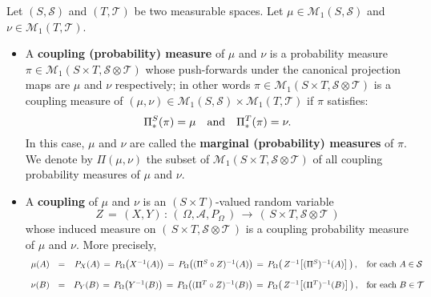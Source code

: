 \begin{definition}
\mbox{}\vskip 0.1cm
\noindent
Let $\left(S,\mathcal{S}\right)$ and $\left(T,\mathcal{T}\right)$ be two measurable spaces.
Let $\mu \in \mathcal{M}_{1}\!\left(S,\mathcal{S}\right)$ and
$\nu \in \mathcal{M}_{1}\!\left(T,\mathcal{T}\right)$.
\begin{itemize}
\item
	A \textbf{coupling (probability) measure} of $\mu$ and $\nu$ is a probability measure
	$\pi \in \mathcal{M}_{1}\!\left(S \times T, \mathcal{S} \otimes \mathcal{T}\right)$
	whose push-forwards under the canonical projection maps are $\mu$ and $\nu$ respectively;
	in other words
	$\pi \in \mathcal{M}_{1}\!\left(S \times T, \mathcal{S} \otimes \mathcal{T}\right)$
	is a coupling measure of
	$(\mu,\nu ) \in \mathcal{M}_{1}\!\left(S,\mathcal{S}\right) \times \mathcal{M}_{1}\!\left(T,\mathcal{T}\right)$
	if $\pi$ satisfies:
	\begin{equation*}
		\Pi^{S}_{*}(\pi) = \mu
		\quad\textnormal{and}\quad
		\Pi^{T}_{*}(\pi) = \nu.
	\end{equation*}
	In this case, $\mu$ and $\nu$ are called the \textbf{marginal (probability) measures} of $\pi$.
	We denote by $\Pi\!\left(\mu,\nu\right)$ the subset of
	$\mathcal{M}_{1}\!\left(S \times T, \mathcal{S} \otimes \mathcal{T}\right)$
	of all coupling probability measures of $\mu$ and $\nu$.
\item
	A \textbf{coupling} of $\mu$ and $\nu$ is an $(S \times T)$-valued random variable
	\begin{equation*}
		Z \, = \, (X,Y)
		\,:\, \left(\,\Omega,\mathcal{A},P_{\Omega}\,\right)
		\,\longrightarrow\, \left(\,S \times T, \mathcal{S} \otimes \mathcal{T}\,\right)
	\end{equation*}
	whose induced measure on $\left(\,S \times T, \mathcal{S} \otimes \mathcal{T}\,\right)$
	is a coupling probability measure of $\mu$ and $\nu$. More precisely,
	\begin{equation*}
	\begin{array}{cccl}
		\mu(A) & = & P_{X}(A)
			\,=\, P_{\Omega}\!\left(X^{-1}(A)\right)
			\,=\, P_{\Omega}\!\left((\Pi^{S}\circ Z)^{-1}(A)\right)
			\,=\, P_{\Omega}\!\left(\,Z^{-1}\!\left[(\Pi^{S})^{-1}(A)\right]\,\right),
			& \textnormal{for each $A \in \mathcal{S}$}
		\\ \\
		\nu(B) & = & P_{Y}(B)
			\,=\, P_{\Omega}\!\left(Y^{-1}(B)\right)
			\,=\, P_{\Omega}\!\left((\Pi^{T}\circ Z)^{-1}(B)\right)
			\,=\, P_{\Omega}\!\left(\,Z^{-1}\!\left[(\Pi^{T})^{-1}(B)\right]\,\right),
			& \textnormal{for each $B \in \mathcal{T}$}
	\end{array}
	\end{equation*}
\end{itemize}
\end{definition}

